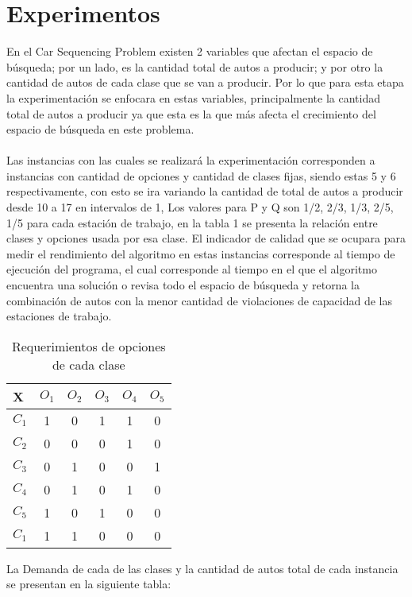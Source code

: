 \documentclass[letter, 10pt]{article}
\begin{document}
\section{Experimentos}
En el Car Sequencing Problem existen 2 variables que afectan el espacio de b\'usqueda; por un lado, es la cantidad total de autos a producir; y por otro la cantidad de autos de cada clase que se van a producir. Por lo que para esta etapa la experimentaci\'on se enfocara en estas variables, principalmente la cantidad total de autos a producir ya que esta es la que m\'as afecta el crecimiento del espacio de b\'usqueda en este problema.\\\\
Las instancias con las cuales se realizar\'a la experimentaci\'on corresponden a instancias con cantidad de opciones y cantidad de clases fijas, siendo estas 5 y 6 respectivamente, con esto se ira variando la cantidad de total de autos a producir desde 10 a 17 en intervalos de 1, Los valores para P y Q son 1/2, 2/3, 1/3, 2/5, 1/5 para cada estaci\'on de trabajo, en la tabla 1 se presenta la relaci\'on entre clases y opciones usada por esa clase. El indicador de calidad que se ocupara para medir el rendimiento del algoritmo en estas instancias corresponde al tiempo de ejecuci\'on del programa, el cual corresponde al tiempo en el que el algoritmo encuentra una soluci\'on o revisa todo el espacio de b\'usqueda y retorna la combinaci\'on de autos con la menor cantidad de violaciones de capacidad de las estaciones de trabajo.\newline
\begin{table}[H]
\centering
\begin{tabular}{|l|c|c|c|c|c|}
\hline
X & $O_1$ & $O_2$ & $O_3$ & $O_4$ & $O_5$ \\ \hline
$C_1$ & 1  & 0  & 1  & 1  & 0  \\ \hline
$C_2$ & 0  & 0  & 0  & 1  & 0  \\ \hline
$C_3$ & 0  & 1  & 0  & 0  & 1  \\ \hline
$C_4$ & 0  & 1  & 0  & 1  & 0  \\ \hline
$C_5$ & 1  & 0  & 1  & 0  & 0  \\ \hline
$C_1$ & 1  & 1  & 0  & 0  & 0  \\ \hline
\end{tabular}
\caption{Requerimientos de opciones de cada clase}
\end{table}
La Demanda de cada de las clases y la cantidad de autos total de cada instancia se presentan en la siguiente tabla:
\end{document}
